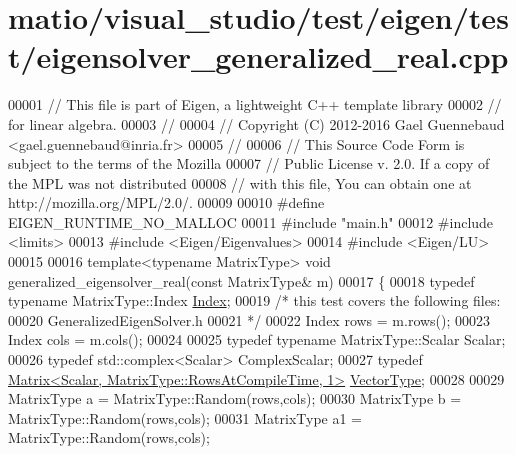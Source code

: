 \hypertarget{matio_2visual__studio_2test_2eigen_2test_2eigensolver__generalized__real_8cpp_source}{}\section{matio/visual\+\_\+studio/test/eigen/test/eigensolver\+\_\+generalized\+\_\+real.cpp}
\label{matio_2visual__studio_2test_2eigen_2test_2eigensolver__generalized__real_8cpp_source}

\begin{DoxyCode}
00001 \textcolor{comment}{// This file is part of Eigen, a lightweight C++ template library}
00002 \textcolor{comment}{// for linear algebra.}
00003 \textcolor{comment}{//}
00004 \textcolor{comment}{// Copyright (C) 2012-2016 Gael Guennebaud <gael.guennebaud@inria.fr>}
00005 \textcolor{comment}{//}
00006 \textcolor{comment}{// This Source Code Form is subject to the terms of the Mozilla}
00007 \textcolor{comment}{// Public License v. 2.0. If a copy of the MPL was not distributed}
00008 \textcolor{comment}{// with this file, You can obtain one at http://mozilla.org/MPL/2.0/.}
00009 
00010 \textcolor{preprocessor}{#define EIGEN\_RUNTIME\_NO\_MALLOC}
00011 \textcolor{preprocessor}{#include "main.h"}
00012 \textcolor{preprocessor}{#include <limits>}
00013 \textcolor{preprocessor}{#include <Eigen/Eigenvalues>}
00014 \textcolor{preprocessor}{#include <Eigen/LU>}
00015 
00016 \textcolor{keyword}{template}<\textcolor{keyword}{typename} MatrixType> \textcolor{keywordtype}{void} generalized\_eigensolver\_real(\textcolor{keyword}{const} MatrixType& m)
00017 \{
00018   \textcolor{keyword}{typedef} \textcolor{keyword}{typename} MatrixType::Index \hyperlink{namespace_eigen_a62e77e0933482dafde8fe197d9a2cfde}{Index};
00019   \textcolor{comment}{/* this test covers the following files:}
00020 \textcolor{comment}{     GeneralizedEigenSolver.h}
00021 \textcolor{comment}{  */}
00022   Index rows = m.rows();
00023   Index cols = m.cols();
00024 
00025   \textcolor{keyword}{typedef} \textcolor{keyword}{typename} MatrixType::Scalar Scalar;
00026   \textcolor{keyword}{typedef} std::complex<Scalar> ComplexScalar;
00027   \textcolor{keyword}{typedef} \hyperlink{group___core___module_class_eigen_1_1_matrix}{Matrix<Scalar, MatrixType::RowsAtCompileTime, 1>} 
      \hyperlink{struct_vector_type}{VectorType};
00028 
00029   MatrixType a = MatrixType::Random(rows,cols);
00030   MatrixType b = MatrixType::Random(rows,cols);
00031   MatrixType a1 = MatrixType::Random(rows,cols);

\end{DoxyCode}
